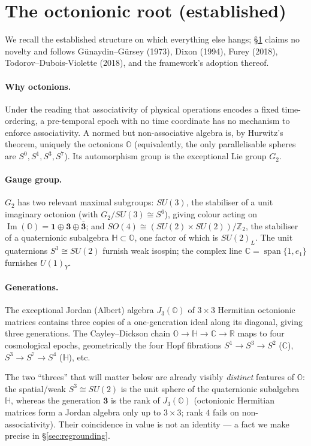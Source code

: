\documentclass[11pt]{article}
\theoremstyle{definition}
\newcommand{\OO}{\mathbb{O}}
\newcommand{\HH}{\mathbb{H}}
\newcommand{\CC}{\mathbb{C}}
\newcommand{\RR}{\mathbb{R}}
\newcommand{\Imag}{\operatorname{Im}}
\newcommand{\JthreeO}{J_3(\OO)}
\begin{document}
\section{The octonionic root (established)}\label{sec:root}

We recall the established structure on which everything else hangs; \S\ref{sec:root} claims no novelty and follows G\"unaydin--G\"ursey (1973), Dixon (1994), Furey (2018), Todorov--Dubois-Violette (2018), and the framework's adoption thereof.

\paragraph{Why octonions.} Under the reading that associativity of physical operations encodes a fixed time-ordering, a pre-temporal epoch with no time coordinate has no mechanism to enforce associativity. A normed but non-associative algebra is, by Hurwitz's theorem, uniquely the octonions $\OO$ (equivalently, the only parallelisable spheres are $S^0,S^1,S^3,S^7$). Its automorphism group is the exceptional Lie group $G_2$.

\paragraph{Gauge group.} $G_2$ has two relevant maximal subgroups: $SU(3)$, the stabiliser of a unit imaginary octonion (with $G_2/SU(3)\cong S^6$), giving colour acting on $\Imag(\OO)=\mathbf 1\oplus\mathbf 3\oplus\bar{\mathbf 3}$; and $SO(4)\cong(SU(2)\times SU(2))/\mathbb Z_2$, the stabiliser of a quaternionic subalgebra $\HH\subset\OO$, one factor of which is $SU(2)_L$. The unit quaternions $S^3\cong SU(2)$ furnish weak isospin; the complex line $\CC=\operatorname{span}\{1,e_1\}$ furnishes $U(1)_Y$.

\paragraph{Generations.} The exceptional Jordan (Albert) algebra $\JthreeO$ of $3\times3$ Hermitian octonionic matrices contains three copies of a one-generation ideal along its diagonal, giving three generations. The Cayley--Dickson chain $\OO\to\HH\to\CC\to\RR$ maps to four cosmological epochs, geometrically the four Hopf fibrations $S^1\!\to\!S^3\!\to\!S^2$ ($\CC$), $S^3\!\to\!S^7\!\to\!S^4$ ($\HH$), etc.

The two ``threes'' that will matter below are already visibly \emph{distinct} features of $\OO$: the spatial/weak $S^3\cong SU(2)$ is the unit sphere of the quaternionic subalgebra $\HH$, whereas the generation $\mathbf{3}$ is the rank of $\JthreeO$ (octonionic Hermitian matrices form a Jordan algebra only up to $3\times3$; rank $4$ fails on non-associativity). Their coincidence in value is not an identity --- a fact we make precise in \S\ref{sec:regrounding}.
\end{document}

